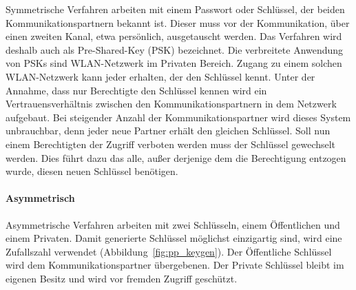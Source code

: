 \documentclass[11pt,a4paper]{report}
\begin{document}
Symmetrische Verfahren arbeiten mit einem Passwort oder Schlüssel, der beiden Kommunikationspartnern bekannt ist. Dieser muss vor der Kommunikation, über einen zweiten Kanal, etwa persönlich, ausgetauscht werden. Das Verfahren wird deshalb auch als Pre-Shared-Key (PSK) bezeichnet. Die verbreitete Anwendung von PSKs sind WLAN-Netzwerk im Privaten Bereich. Zugang zu einem solchen WLAN-Netzwerk kann jeder erhalten, der den Schlüssel kennt. Unter der Annahme, dass nur Berechtigte den Schlüssel kennen wird ein Vertrauensverhältnis zwischen den Kommunikationspartnern in dem Netzwerk aufgebaut. Bei steigender Anzahl der Kommunikationspartner wird dieses System unbrauchbar, denn jeder neue Partner erhält den gleichen Schlüssel. Soll nun einem Berechtigten der Zugriff verboten werden muss der Schlüssel gewechselt werden. Dies führt dazu das alle, außer derjenige dem die Berechtigung entzogen wurde, diesen neuen Schlüssel benötigen.

\paragraph{Asymmetrisch} \label{sec:auth_asym}

Asymmetrische Verfahren arbeiten mit zwei Schlüsseln, einem Öffentlichen und einem Privaten. Damit generierte Schlüssel möglichst einzigartig sind, wird eine Zufallszahl verwendet (Abbildung~\ref{fig:pp_keygen}). Der Öffentliche Schlüssel wird dem Kommunikationspartner übergebenen. Der Private Schlüssel bleibt im eigenen Besitz und wird vor fremden Zugriff geschützt. 
\end{document}
